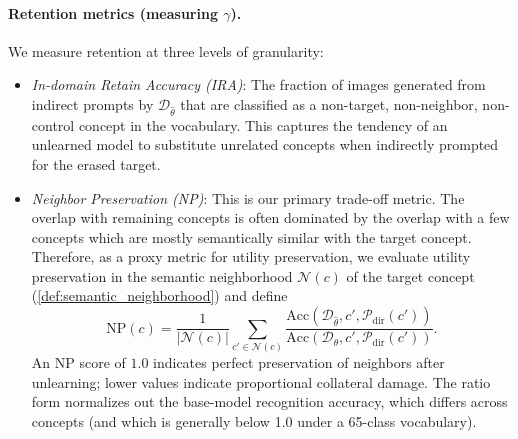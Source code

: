 \paragraph{Retention metrics (measuring $\gamma$).}
We measure retention at three levels of granularity:
\begin{itemize}
    \item \emph{In-domain Retain Accuracy (IRA)}: The fraction of images generated from indirect prompts by $\mathcal{D}_{\hat\theta}$ that are classified as a non-target, non-neighbor, non-control concept in the vocabulary. This captures the tendency of an unlearned model to substitute unrelated concepts when indirectly prompted for the erased target.
    \item \emph{Neighbor Preservation (NP)}: This is our primary trade-off metric. The overlap with remaining concepts is often dominated by the overlap with a few concepts which are mostly semantically similar with the target concept. Therefore, as a proxy metric for utility preservation, we evaluate utility preservation in the semantic neighborhood $\mathcal{N}(c)$ of the target concept (\cref{def:semantic_neighborhood}) and define
    \begin{equation}
    \label{eq:neighbor_pres}
    \mathrm{NP}(c) = \frac{1}{|\mathcal{N}(c)|} \sum_{c' \in \mathcal{N}(c)} \frac{\mathrm{Acc}(\mathcal{D}_{\hat\theta}, c', \mathcal{P}_{\mathrm{dir}}(c'))}
    {\mathrm{Acc}(\mathcal{D}_\theta, c', \mathcal{P}_{\mathrm{dir}}(c'))}.
    \end{equation}
    An NP score of $1.0$ indicates perfect preservation of neighbors after unlearning; lower values indicate proportional collateral damage. The ratio form normalizes out the base-model recognition accuracy, which differs across concepts (and which is generally below 1.0 under a 65-class vocabulary).

\end{itemize}
